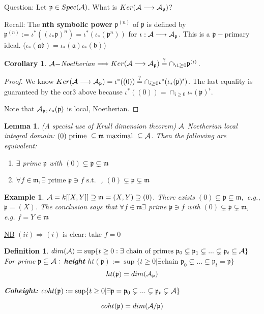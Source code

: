\documentclass[11pt]{article}
\newtheorem{lemma}[thm]{Lemma}
\newtheorem{cor}[thm]{Corollary}
\newtheorem{dfn}[thm]{Definition}
\newtheorem{ex}[thm]{Example}
\newcommand{\sca}{{\mathfrak a}}
\newcommand{\scb}{{\mathfrak b}}
\newcommand{\scm}{{\mathfrak m}}
\newcommand{\scp}{{\mathfrak p}}
\newcommand{\cala}{{\cal A}}
\newcommand{\Lrta}{\Longrightarrow}
\newcommand{\lrta}{\longrightarrow}
\begin{document}
Question: Let $\scp\in Spec(\cala)$. What is $Ker(\cala\lrta \cala_\scp)$?

Recall: The \textbf{nth symbolic power} $\scp^{(n)}$ of $\scp$ is defined by $\scp^{(n)}:=\iota^*((\iota_*\scp)^n)=\iota^*(\iota_*(\scp^n))$ for $\iota:\cala\lrta \cala_\scp$. This is a $\scp-$primary ideal. ($\iota_*(\sca\scb)=\iota_*(\sca)\iota_*(\scb)$)
\begin{cor}
 $\cala-$Noetherian $\Lrta Ker(\cala\lrta \cala_\scp)\overset{?}{=}\cap_{\i\geq 0}\scp^{(i)}$.
\end{cor}
\begin{proof}
We know $Ker(\cala\lrta \cala_\scp)=\iota^*((0))\overset{?}{=}\cap_{i\geq 0}\iota^*(\iota_*(\scp)^i)$.
 The last equality is guaranteed by the cor3 above because $\iota^*((0))=\cap_{i\geq 0}\iota_*(\scp)^i$. 

 Note that $\cala_\scp,\iota_*(\scp)$ is local, Noetherian.
\end{proof}

\begin{lemma}\label{lem_5}
(A special use of Krull dimension theorem)
$\cala$ Noetherian local integral domain: $(0)\text{ prime } \subseteq \scm \text{ maximal }\subseteq \cala$. Then the following are equivalent:
\begin{enumerate}[label=(\roman*)]
\item $\exists $ prime $\scp$ with $(0)\subsetneq \scp\subsetneq \scm$
\item $\forall f\in\scm,\exists\text{ prime }\scp\ni f \text{ s.t. }$ , $(0)\subsetneq \scp\subsetneq \scm$
\end{enumerate}
\end{lemma}

\begin{ex}
$\cala=k[[X,Y]]\supseteq \scm=(X,Y)\supseteq (0)$. There exists $(0)\subsetneq\scp\subsetneq\scm,$ e.g., $\scp=(X)$. The conclusion says that $\forall f\in\scm\exists $ prime $\scp\ni f$ with  $(0)\subsetneq \scp\subsetneq \scm$, e.g. $f=Y\in\scm$
\end{ex}

\underline{NB} $(ii)\Lrta(i)$ is clear: take $f=0$


\begin{dfn}
$dim(\cala)=\sup \{t\geq 0:\exists \text{ chain of primes $\scp_0\subsetneq \scp_1\subsetneq ...\subsetneq \scp_t\subseteq \cala$}\}$\\

For prime $\scp\subseteq \cala:$ \textbf{ height }$ht(\scp):=\sup \{t\geq 0|\exists\text{chain $\scp_0\subsetneq ...\subsetneq \scp_t=\scp$}\}$
$$
ht(\scp)=dim(\cala_\scp)
$$

\textbf{Coheight:} $coht(\scp):=\sup\{t\geq 0|\exists \scp=\scp_0\subsetneq ...\subsetneq \scp_t\subsetneq \cala\}$

$$
coht(\scp)=dim(\cala/\scp)
$$
\end{dfn}
 
\end{document}
